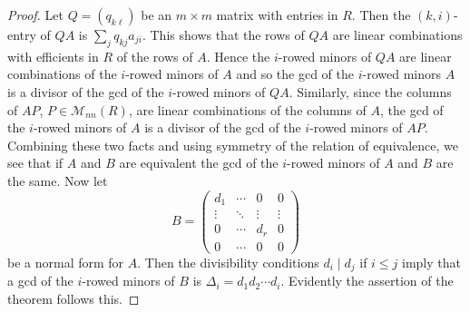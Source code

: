 \begin{proof}
Let $Q=(q_{k\ell})$ be an $m\times m$ matrix with entries in $R$. Then the $(k,i)$-entry of $QA$ is $\sum_{j}q_{kj}a_{ji}$. This shows that the rows of $QA$ are linear combinations with efficients in $R$ of the rows of $A$. Hence the $i$-rowed minors of $QA$ are linear combinations of the $i$-rowed minors of $A$ and so the gcd of the $i$-rowed minors $A$ is a divisor of the gcd of the $i$-rowed minors of $QA$. Similarly, since the columns of $AP$, $P\in\mathcal{M}_{nn}(R)$, are linear combinations of the columns of $A$, the gcd of the $i$-rowed minors of $A$ is a divisor of the gcd of the $i$-rowed minors of $AP$. Combining these two facts and using symmetry of the relation of equivalence, we see that if $A$ and $B$ are equivalent the gcd of the $i$-rowed minors of $A$ and $B$ are the same. Now let 
\[B=\left(\begin{array}{ccc|c}
d_1&\cdots&0&0\\
\vdots&\ddots&\vdots&\vdots\\
0&\cdots&d_r&0\\
\hline
0&\cdots&0&0
\end{array}\right)\] 
be a normal form for $A$. Then the divisibility conditions $d_i\mid d_j$ if $i\leq j$ imply that a gcd of the $i$-rowed minors of $B$ is $\Delta_i=d_1d_2\cdots d_i$. Evidently the assertion of the theorem follows this.
\end{proof}
\vspace{5mm}
